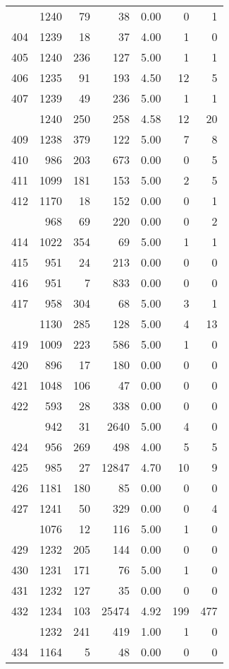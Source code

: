 \documentclass[
]{article}
\begin{document}
\begin{table}
\begin{tabular}[t]{lrrrrrr}
\addlinespace
403 & 1240 & 79 & 38 & 0.00 & 0 & 1\\
404 & 1239 & 18 & 37 & 4.00 & 1 & 0\\
405 & 1240 & 236 & 127 & 5.00 & 1 & 1\\
406 & 1235 & 91 & 193 & 4.50 & 12 & 5\\
407 & 1239 & 49 & 236 & 5.00 & 1 & 1\\
\addlinespace
408 & 1240 & 250 & 258 & 4.58 & 12 & 20\\
409 & 1238 & 379 & 122 & 5.00 & 7 & 8\\
410 & 986 & 203 & 673 & 0.00 & 0 & 5\\
411 & 1099 & 181 & 153 & 5.00 & 2 & 5\\
412 & 1170 & 18 & 152 & 0.00 & 0 & 1\\
\addlinespace
413 & 968 & 69 & 220 & 0.00 & 0 & 2\\
414 & 1022 & 354 & 69 & 5.00 & 1 & 1\\
415 & 951 & 24 & 213 & 0.00 & 0 & 0\\
416 & 951 & 7 & 833 & 0.00 & 0 & 0\\
417 & 958 & 304 & 68 & 5.00 & 3 & 1\\
\addlinespace
418 & 1130 & 285 & 128 & 5.00 & 4 & 13\\
419 & 1009 & 223 & 586 & 5.00 & 1 & 0\\
420 & 896 & 17 & 180 & 0.00 & 0 & 0\\
421 & 1048 & 106 & 47 & 0.00 & 0 & 0\\
422 & 593 & 28 & 338 & 0.00 & 0 & 0\\
\addlinespace
423 & 942 & 31 & 2640 & 5.00 & 4 & 0\\
424 & 956 & 269 & 498 & 4.00 & 5 & 5\\
425 & 985 & 27 & 12847 & 4.70 & 10 & 9\\
426 & 1181 & 180 & 85 & 0.00 & 0 & 0\\
427 & 1241 & 50 & 329 & 0.00 & 0 & 4\\
\addlinespace
428 & 1076 & 12 & 116 & 5.00 & 1 & 0\\
429 & 1232 & 205 & 144 & 0.00 & 0 & 0\\
430 & 1231 & 171 & 76 & 5.00 & 1 & 0\\
431 & 1232 & 127 & 35 & 0.00 & 0 & 0\\
432 & 1234 & 103 & 25474 & 4.92 & 199 & 477\\
\addlinespace
433 & 1232 & 241 & 419 & 1.00 & 1 & 0\\
434 & 1164 & 5 & 48 & 0.00 & 0 & 0\\

\end{tabular}
\end{table}
\end{document}
